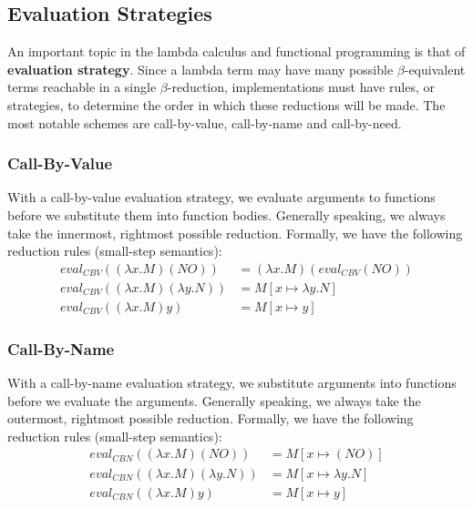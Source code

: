 \documentclass{article}
\begin{document}
\subsection{Evaluation Strategies}
An important topic in the lambda calculus and functional programming is that of \textbf{evaluation strategy}. Since a lambda term may have many possible $\beta$-equivalent terms reachable in a single $\beta$-reduction, implementations must have rules, or strategies, to determine the order in which these reductions will be made. The most notable schemes are call-by-value, call-by-name and call-by-need.

\subsubsection{Call-By-Value}
With a call-by-value evaluation strategy, we evaluate arguments to functions before we substitute them into function bodies. Generally speaking, we always take the innermost, rightmost possible reduction. Formally, we have the following reduction rules (small-step semantics):
\begin{align*}
            eval_{CBV} ( (\lambda x.M) (N O) ) &= (\lambda x.M) (eval_{CBV} (N O) ) \\
    eval_{CBV} ( (\lambda x.M) (\lambda y.N) ) &= M[x \mapsto \lambda y.N]          \\
              eval_{CBV} ( (\lambda x.M) y )   &= M[x \mapsto y]
\end{align*}
\subsubsection{Call-By-Name}
With a call-by-name evaluation strategy, we substitute arguments into functions before we evaluate the arguments. Generally speaking, we always take the outermost, rightmost possible reduction. Formally, we have the following reduction rules (small-step semantics):
\begin{align*}
            eval_{CBN} ( (\lambda x.M) (N O) ) &= M[x \mapsto (N O)]       \\
    eval_{CBN} ( (\lambda x.M) (\lambda y.N) ) &= M[x \mapsto \lambda y.N] \\
              eval_{CBN} ( (\lambda x.M) y )   &= M[x \mapsto y]
\end{align*}
\end{document}
